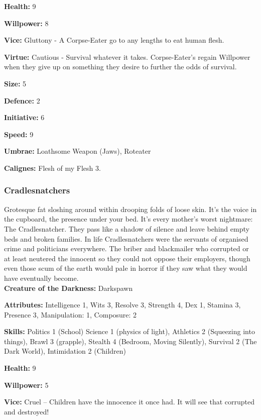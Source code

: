 \noindent \textbf{Health:} 9

\noindent \textbf{Willpower:} 8

\noindent \textbf{Vice:} Gluttony - A Corpse-Eater go to any lengths to eat human flesh.

\noindent \textbf{Virtue:} Cautious - Survival whatever it takes. Corpse-Eater's regain Willpower when they give up on something they desire to further the odds of survival.

\noindent \textbf{Size:} 5

\noindent \textbf{Defence:} 2

\noindent \textbf{Initiative:} 6

\noindent \textbf{Speed:} 9

\noindent \textbf{Umbrae:} Loathsome Weapon (Jaws), Roteater

\noindent \textbf{Calignes:} Flesh of my Flesh 3.

\subsubsection*{Cradlesnatchers}

Grotesque fat sloshing around within drooping folds of loose skin. It's the voice in the cupboard, the presence under your bed. It's every mother's worst nightmare: The Cradlesnatcher. They pass like a shadow of silence and leave behind empty beds and broken families. In life Cradlesnatchers were the servants of organised crime and politicians everywhere. The briber and blackmailer who corrupted or at least neutered the innocent so they could not oppose their employers, though even those scum of the earth would pale in horror if they saw what they would have eventually become.\\

\noindent \textbf{Creature of the Darkness:} Darkspawn

\noindent \textbf{Attributes:} Intelligence 1, Wits 3, Resolve 3, Strength 4, Dex 1, Stamina 3, Presence 3, Manipulation: 1, Composure: 2

\noindent \textbf{Skills:} Politics 1 (School) Science 1 (physics of light), Athletics 2 (Squeezing into things), Brawl 3 (grapple), Stealth 4 (Bedroom, Moving Silently), Survival 2 (The Dark World), Intimidation 2 (Children)

\noindent \textbf{Health:} 9

\noindent \textbf{Willpower:} 5

\noindent \textbf{Vice:} Cruel – Children have the innocence it once had. It will see that corrupted and destroyed!

